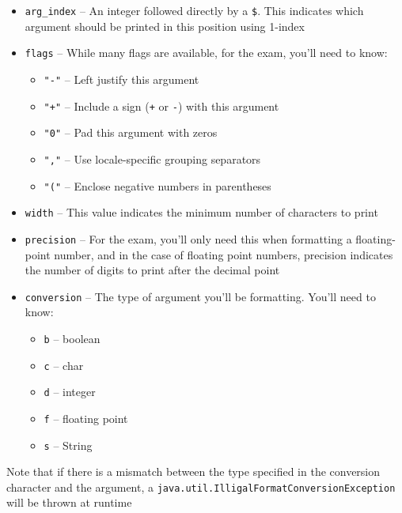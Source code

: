 \begin{itemize}
    \item \verb#arg_index# -- An integer followed directly by a \verb#$#. This 
    indicates which argument should be printed in this position using 1-index
    \item \verb#flags# -- While many flags are available, for the exam, you'll 
    need to know:
        \begin{itemize}
            \item \verb#"-"# -- Left justify this argument
            \item \verb#"+"# -- Include a sign (\verb#+# or \verb#-#) with this 
            argument
            \item \verb#"0"# -- Pad this argument with zeros
            \item \verb#","# -- Use locale-specific grouping separators
            \item \verb#"("# -- Enclose negative numbers in parentheses
        \end{itemize}
    \item \verb#width# -- This value indicates the minimum number of characters 
    to print
    \item \verb#precision# -- For the exam, you'll only need this when 
    formatting a floating-point number, and in the case of floating point 
    numbers, precision indicates the number of digits to print after the 
    decimal point
    \item \verb#conversion# -- The type of argument you'll be formatting.  
    You'll need to know:
        \begin{itemize}
            \item \verb#b# -- boolean
            \item \verb#c# -- char
            \item \verb#d# -- integer
            \item \verb#f# -- floating point
            \item \verb#s# -- String
        \end{itemize}
\end{itemize}
Note that if there is a mismatch between the type specified in the conversion 
character and the argument, a \verb#java.util.IlligalFormatConversionException# 
will be thrown at runtime
